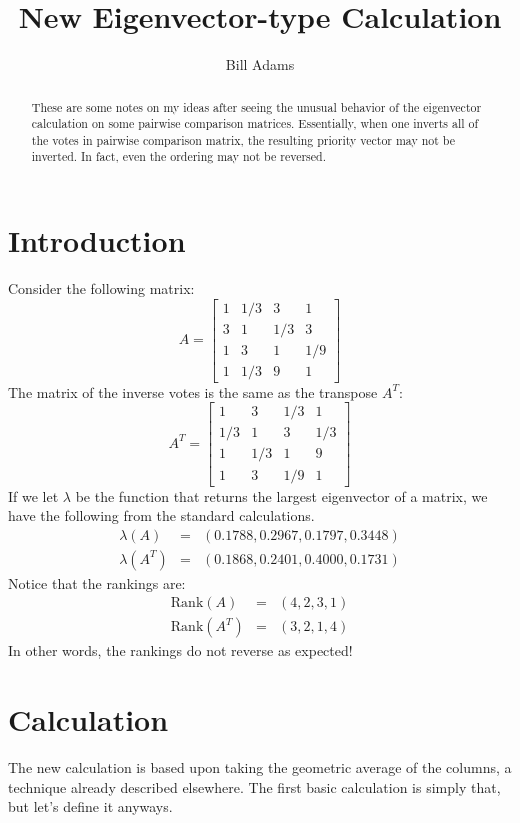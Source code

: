 \documentclass{article}
\title{New Eigenvector-type Calculation}
\author{Bill Adams}
\begin{document}
\maketitle
\begin{abstract}
These are some notes on my ideas after seeing the unusual behavior
of the eigenvector calculation on some pairwise comparison matrices.
Essentially, when one inverts all of the votes in pairwise comparison
matrix, the resulting priority vector may not be inverted.  In fact,
even the ordering may not be reversed.
\end{abstract}

\section{Introduction}
Consider the following matrix:
$$A =\begin{bmatrix}
1   & 1/3 &  3  & 1   \\
3   & 1   & 1/3 & 3   \\
1   & 3   & 1   & 1/9 \\
1   & 1/3 & 9   & 1
\end{bmatrix}
$$
The matrix of the inverse votes is the same as the transpose $A^T$:
$$A^T =\begin{bmatrix}
1   & 3   & 1/3 & 1   \\
1/3 & 1   & 3   & 1/3 \\
1   & 1/3 & 1   & 9   \\
1   & 3   & 1/9 & 1
\end{bmatrix}
$$
If we let $\lambda$ be the function that returns the largest
eigenvector of a matrix, we have the following from the standard
calculations.
\begin{eqnarray*}
	\lambda(A)&=&(0.1788,0.2967, 0.1797, 0.3448) \\
	\lambda(A^T)&=&(0.1868, 0.2401, 0.4000, 0.1731)
\end{eqnarray*}
Notice that the rankings are:
\begin{eqnarray*}
	\mathrm{Rank}(A)&=&(4, 2, 3, 1) \\
	\mathrm{Rank}(A^T)&=&(3, 2, 1, 4)
\end{eqnarray*}
In other words, the rankings do not reverse as expected!

\section{Calculation}
The new calculation is based upon taking the geometric average of
the columns, a technique already described elsewhere.  The first
basic calculation is simply that, but let's define it anyways.
\end{document}
